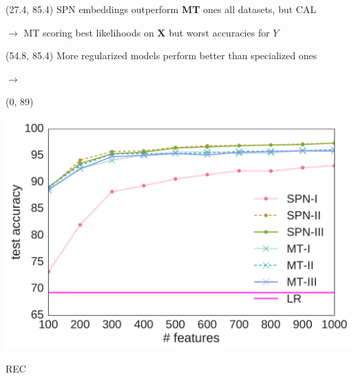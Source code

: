 \documentclass[final]{beamer}
\begin{document}
\begin{frame}{}
  \begin{textblock}{25.2}(27.4, 85.4)
    \small
    \textsf{SPN} embeddings outperform \textbf{MT} ones all datasets,
    but \textsf{CAL}\par
    \hspace{30pt}$\rightarrow$ MT scoring best likelihoods on
    $\mathbf{X}$ but worst accuracies for $Y$
  \end{textblock}
  
  \begin{textblock}{25.2}(54.8, 85.4)
    \small
    More regularized models perform better than specialized ones\par
    \hspace{30pt}$\rightarrow$ 
  \end{textblock}
  
  \begin{textblock}{80}(0, 89)
    \begin{center}
      \begin{minipage}[t]{0.2\linewidth}
        \begin{center}
          \includegraphics[width=1.0\linewidth]{figures/lines-rectangles}\par
          \footnotesize\textsf{REC}
        \end{center}
      \end{minipage}\begin{minipage}[t]{0.2\linewidth}
        \begin{center}

\end{center}
\end{minipage}
\end{center}
\end{textblock}
\end{frame}
\end{document}
